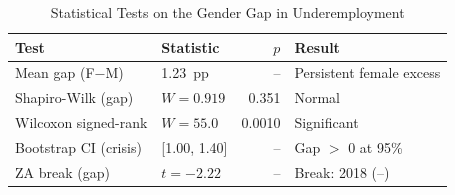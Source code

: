 \begin{table}[htbp]
\caption{Statistical Tests on the Gender Gap in Underemployment}
\label{tab:gender_gap_tests}
\centering
\footnotesize
\begin{tabular}{@{}llrl@{}}
\toprule
\textbf{Test} & \textbf{Statistic} & \textbf{$p$} & \textbf{Result}\\
\midrule
Mean gap (F$-$M) & 1.23~pp & -- & Persistent female excess\\
Shapiro-Wilk (gap) & $W=0.919$ & 0.351 & Normal\\
Wilcoxon signed-rank & $W=55.0$ & 0.0010 & Significant\\
Bootstrap CI (crisis) & [1.00, 1.40] & -- & Gap $>$ 0 at 95\%\\
ZA break (gap) & $t=-2.22$ & -- & Break: 2018 (--)\\
\bottomrule
\end{tabular}
\end{table}
